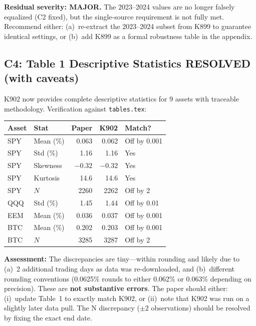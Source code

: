 \documentclass[12pt,a4paper]{article}
\begin{document}
\textbf{Residual severity: MAJOR.} The 2023--2024 values are no longer falsely equalized (C2 fixed), but the single-source requirement is not fully met. Recommend either: (a)~re-extract the 2023--2024 subset from K899 to guarantee identical settings, or (b)~add K899 as a formal robustness table in the appendix.


\subsection*{C4: Table 1 Descriptive Statistics \hfill \textcolor{resolved}{RESOLVED (with caveats)}}

K902 now provides complete descriptive statistics for 9 assets with traceable methodology. Verification against \texttt{tables.tex}:

\medskip
\begin{tabular}{llrrl}
\toprule
\textbf{Asset} & \textbf{Stat} & \textbf{Paper} & \textbf{K902} & \textbf{Match?} \\
\midrule
SPY & Mean (\%) & 0.063 & 0.062 & \textcolor{warncolor}{Off by 0.001} \\
SPY & Std (\%)  & 1.16  & 1.16  & \textcolor{okgreen}{Yes} \\
SPY & Skewness  & $-0.32$ & $-0.32$ & \textcolor{okgreen}{Yes} \\
SPY & Kurtosis  & 14.6  & 14.6  & \textcolor{okgreen}{Yes} \\
SPY & $N$       & 2260  & 2262  & \textcolor{warncolor}{Off by 2} \\
QQQ & Std (\%)  & 1.45  & 1.44  & \textcolor{warncolor}{Off by 0.01} \\
EEM & Mean (\%) & 0.036 & 0.037 & \textcolor{warncolor}{Off by 0.001} \\
BTC & Mean (\%) & 0.202 & 0.203 & \textcolor{warncolor}{Off by 0.001} \\
BTC & $N$       & 3285  & 3287  & \textcolor{warncolor}{Off by 2} \\
\bottomrule
\end{tabular}

\medskip
\noindent\textbf{Assessment:} The discrepancies are tiny---within rounding and likely due to (a)~2 additional trading days as data was re-downloaded, and (b)~different rounding conventions (0.0625\% rounds to either 0.062\% or 0.063\% depending on precision). These are \textbf{not substantive errors}. The paper should either: (i)~update Table~1 to exactly match K902, or (ii)~note that K902 was run on a slightly later data pull. The N discrepancy ($\pm 2$ observations) should be resolved by fixing the exact end date.
\end{document}
